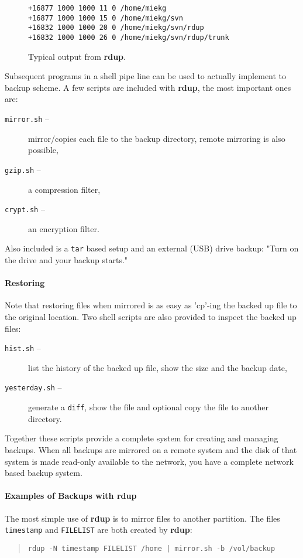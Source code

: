 \documentclass[a4, 10pt]{article}
\newcommand{\rdup}{\textbf{rdup}}
\newcommand{\cmd}[1]{\texttt{#1}}
\begin{document}
\begin{figure}[hbt]
\begin{verbatim}
+16877 1000 1000 11 0 /home/miekg
+16877 1000 1000 15 0 /home/miekg/svn
+16832 1000 1000 20 0 /home/miekg/svn/rdup
+16832 1000 1000 26 0 /home/miekg/svn/rdup/trunk
\end{verbatim}
\caption{Typical output from \rdup.}
\label{fig1:rdup}
\end{figure}

Subsequent programs in a shell pipe line can be used to actually
implement to backup scheme. A few scripts are included with \rdup, 
the most important ones are:
\begin{description}
        \item[\cmd{mirror.sh} --]{
                mirror/copies each file to the backup directory, remote 
                mirroring is also possible,}
        \item[\cmd{gzip.sh} --]{
                a compression filter,}
        \item[\cmd{crypt.sh} --]{
                an encryption filter.}
\end{description}

Also included is a \cmd{tar} based setup and an external (USB) drive
backup: "Turn on the drive and your backup starts."

\paragraph{Restoring}
Note that restoring files when mirrored is as easy as 'cp'-ing the
backed up file to the original location. Two shell scripts are
also provided to inspect the backed up files:
\begin{description}
        \item[\cmd{hist.sh} --]{
                list the history of the backed up file, show the size
                and the backup date,}
        \item[\cmd{yesterday.sh} --]{
                generate a \cmd{diff}, show the file and optional copy 
                the file to another directory.}
\end{description}

Together these scripts provide a complete system
for creating and managing backups. When all backups are mirrored on a
remote system and the disk of that system is made read-only available to
the network, you have a complete network based backup system.

\paragraph{Examples of Backups with \rdup}
The most simple use of \rdup{} is to mirror files to
another partition. The files \cmd{timestamp} and \cmd{FILELIST} are
both created by \rdup:
\begin{quote}
\begin{verbatim}
rdup -N timestamp FILELIST /home | mirror.sh -b /vol/backup
\end{verbatim}
\end{quote}
\end{document}
